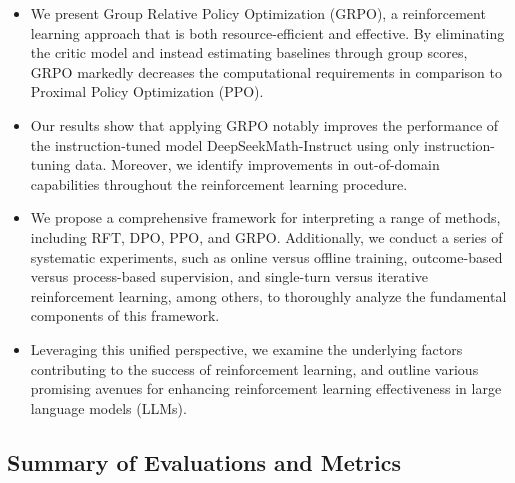 \begin{itemize}[topsep=0pt]
    \item We present Group Relative Policy Optimization (GRPO), a reinforcement learning approach that is both resource-efficient and effective. By eliminating the critic model and instead estimating baselines through group scores, GRPO markedly decreases the computational requirements in comparison to Proximal Policy Optimization (PPO).
    \item Our results show that applying GRPO notably improves the performance of the instruction-tuned model DeepSeekMath-Instruct using only instruction-tuning data. Moreover, we identify improvements in out-of-domain capabilities throughout the reinforcement learning procedure.
    \item We propose a comprehensive framework for interpreting a range of methods, including RFT, DPO, PPO, and GRPO. Additionally, we conduct a series of systematic experiments, such as online versus offline training, outcome-based versus process-based supervision, and single-turn versus iterative reinforcement learning, among others, to thoroughly analyze the fundamental components of this framework.
    \item Leveraging this unified perspective, we examine the underlying factors contributing to the success of reinforcement learning, and outline various promising avenues for enhancing reinforcement learning effectiveness in large language models (LLMs).
\end{itemize}

\subsection{Summary of Evaluations and Metrics}

